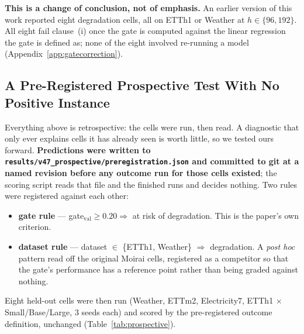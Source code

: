 \textbf{This is a change of conclusion, not of emphasis.}  An earlier version
of this work reported eight degradation cells, all on ETTh1 or Weather at
$h{\in}\{96,192\}$.  All eight fail clause~(i) once the gate is computed
against the linear regression the gate is defined as; none of the eight
involved re-running a model
(Appendix~\ref{app:gatecorrection}).

\subsection{A Pre-Registered Prospective Test With No Positive Instance}
\label{sec:analysis:prospective}

Everything above is retrospective: the cells were run, then read.  A
diagnostic that only ever explains cells it has already seen is worth little,
so we tested ours forward.  \textbf{Predictions were written to
\texttt{results/v47\_prospective/preregistration.json} and committed to git at
a named revision before any outcome run for those cells existed}; the scoring
script reads that file and the finished runs and decides nothing.
Two rules were registered against each other:

\begin{itemize}\itemsep1pt \parskip0pt
  \item \textbf{gate rule} --- gate$_\text{val}\!\geq\!0.20 \Rightarrow$ at
    risk of degradation. This is the paper's own criterion.
  \item \textbf{dataset rule} --- dataset ${\in}$ \{ETTh1, Weather\}
    $\Rightarrow$ degradation. A \emph{post hoc} pattern read off the
    original Moirai cells, registered as a competitor so that the gate's
    performance has a reference point rather than being graded against
    nothing.
\end{itemize}

Eight held-out cells were then run (Weather, ETTm2, Electricity7, ETTh1
$\times$ Small/Base/Large, 3 seeds each) and scored by the pre-registered
outcome definition, unchanged (Table~\ref{tab:prospective}).

\begin{table}[t]
\centering
\caption{\textbf{The pre-registered prospective test.} Predictions frozen in
git before any condition-B or -D run for these cells existed. ``Degradation''
applies the paper's own definition unchanged: gate-passing $\wedge$
forg$_\text{B}{>}0$ in every seed $\wedge$ forg$_\text{D}{<}0$ in every seed.}
\label{tab:prospective}

\end{table}

